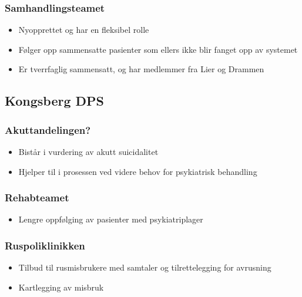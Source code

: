 \documentclass[11pt]{report} %
\begin{document}
                        \subsubsection{Samhandlingsteamet}\label{sec:org_ddps_samh}
                          \begin{itemize}
                            \item Nyopprettet og har en fleksibel rolle\\
                            \item Følger opp sammensatte pasienter som ellers ikke blir fanget opp av systemet\\
                            \item Er tverrfaglig sammensatt, og har medlemmer fra Lier og Drammen\\
                          \end{itemize}  
                        
                  \subsection{Kongsberg DPS}\label{sec:org_kdps}
                      \subsubsection{Akuttandelingen?}\label{sec:org_kdps_akutt}
                          \begin{itemize}
                            \item Bistår i vurdering av akutt suicidalitet\\
                            \item Hjelper til i prosessen ved videre behov for psykiatrisk behandling\\
                          \end{itemize} 
                        \subsubsection{Rehabteamet}\label{sec:org_kdps_rehabliltering}
                          \begin{itemize}
                            \item Lengre oppfølging av pasienter med psykiatriplager\\
                          \end{itemize}
                        \subsubsection{Ruspoliklinikken}\label{sec:org_kdps_ruspol}
                          \begin{itemize}
                            \item Tilbud til rusmisbrukere med samtaler og tilrettelegging for avrusning\\
                            \item Kartlegging av misbruk\\
                          \end{itemize}
\end{document}
